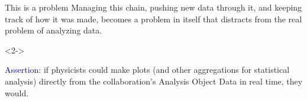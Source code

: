 \documentclass{beamer}
\begin{document}
\begin{frame}{This is a problem}
Managing this chain, pushing new data through it, and keeping track of how it was made, becomes a problem in itself that distracts from the real problem of analyzing data.

\vfill
\begin{uncoverenv}<2->
\begin{center}
\begin{minipage}{0.77\linewidth}
\textcolor{darkblue}{Assertion:} if physicists could make plots (and other aggregations for statistical analysis) directly from the collaboration's Analysis Object Data in real time, they would.
\end{minipage}
\end{center}
\end{uncoverenv}
\end{frame}
\end{document}
